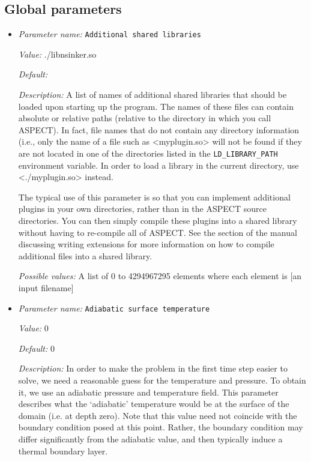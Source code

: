 \subsection{Global parameters}
\label{parameters:global}


\begin{itemize}
\item {\it Parameter name:} {\tt Additional shared libraries}
\label{parameters:Additional shared libraries}
\label{parameters:Additional_20shared_20libraries}


{\it Value:} ./libnsinker.so


{\it Default:} 


{\it Description:} A list of names of additional shared libraries that should be loaded upon starting up the program. The names of these files can contain absolute or relative paths (relative to the directory in which you call ASPECT). In fact, file names that do not contain any directory information (i.e., only the name of a file such as <myplugin.so> will not be found if they are not located in one of the directories listed in the \texttt{LD_LIBRARY_PATH} environment variable. In order to load a library in the current directory, use <./myplugin.so> instead.

The typical use of this parameter is so that you can implement additional plugins in your own directories, rather than in the ASPECT source directories. You can then simply compile these plugins into a shared library without having to re-compile all of ASPECT. See the section of the manual discussing writing extensions for more information on how to compile additional files into a shared library.


{\it Possible values:} A list of 0 to 4294967295 elements where each element is [an input filename]
\item {\it Parameter name:} {\tt Adiabatic surface temperature}
\label{parameters:Adiabatic surface temperature}
\label{parameters:Adiabatic_20surface_20temperature}


{\it Value:} 0


{\it Default:} 0


{\it Description:} In order to make the problem in the first time step easier to solve, we need a reasonable guess for the temperature and pressure. To obtain it, we use an adiabatic pressure and temperature field. This parameter describes what the `adiabatic' temperature would be at the surface of the domain (i.e. at depth zero). Note that this value need not coincide with the boundary condition posed at this point. Rather, the boundary condition may differ significantly from the adiabatic value, and then typically induce a thermal boundary layer.


\end{itemize}

